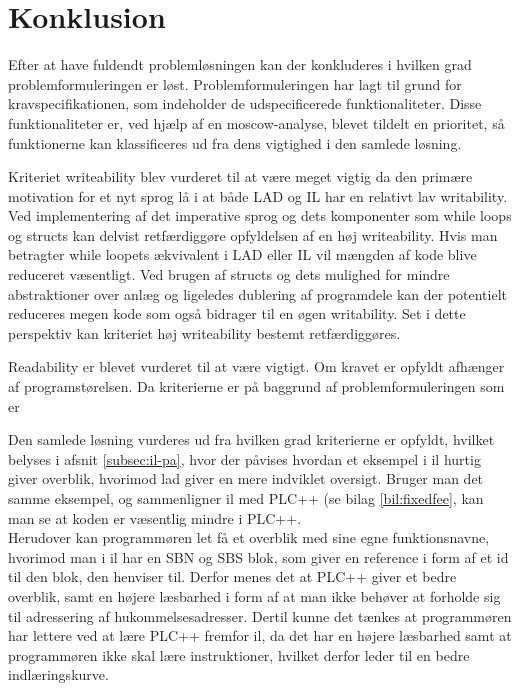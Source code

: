 \chapter{Konklusion}
\label{sec:konklusion}

Efter at have fuldendt problemløsningen kan der konkluderes i hvilken grad problemformuleringen er løst. Problemformuleringen har lagt til grund for kravspecifikationen, som indeholder de udspecificerede funktionaliteter. Disse funktionaliteter er, ved hjælp af en \gls{moscow}-analyse, blevet tildelt en prioritet, så funktionerne kan klassificeres ud fra dens vigtighed i den samlede løsning.



Kriteriet writeability blev vurderet til at være meget vigtig da den primære motivation for et nyt sprog lå i at både LAD og IL har en relativt lav writability.
Ved implementering af det imperative sprog og dets komponenter som while loops og structs kan delvist retfærdiggøre opfyldelsen af en høj writeability. Hvis man betragter while loopets ækvivalent i LAD eller IL vil mængden af kode blive reduceret væsentligt. Ved brugen af structs og dets mulighed for mindre abstraktioner over anlæg og ligeledes dublering af programdele kan der potentielt reduceres megen kode som også bidrager til en øgen writability. Set i dette perspektiv kan kriteriet høj writeability bestemt retfærdiggøres. 

Readability er blevet vurderet til at være vigtigt. Om kravet er opfyldt afhænger af programstørelsen. Da kriterierne er på baggrund af problemformuleringen som er 


Den samlede løsning vurderes ud fra hvilken grad kriterierne er opfyldt, hvilket belyses i afsnit \ref{subsec:il-pa}, hvor der påvises hvordan et eksempel i \gls{il} hurtig giver overblik, hvorimod \gls{lad} giver en mere indviklet oversigt. Bruger man det samme eksempel, og sammenligner \gls{il} med PLC++ (se bilag \ref{bil:fixedfee}, kan man se at koden er væsentlig mindre i PLC++.\\


\noindent Herudover kan programmøren let få et overblik med sine egne funktionsnavne, hvorimod man i \gls{il} har en SBN og SBS blok, som giver en reference i form af et id til den blok, den henviser til.
Derfor menes det at PLC++ giver et bedre overblik, samt en højere læsbarhed i form af at man ikke behøver at forholde sig til adressering af hukommelsesadresser.
Dertil kunne det tænkes at programmøren har lettere ved at lære PLC++ fremfor \gls{il}, da det har en højere  læsbarhed samt at programmøren ikke skal lære instruktioner, hvilket derfor leder til en bedre indlæringskurve. 

